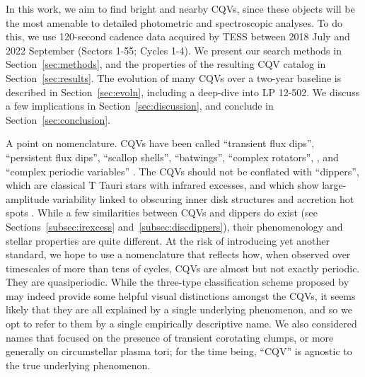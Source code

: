 \documentclass[11pt,twocolumn,tighten]{aastex63}
\begin{document}
In this work, we aim to find bright and nearby CQVs, since these
objects will be the most amenable to detailed photometric and
spectroscopic analyses.  To do this, we use 120-second cadence data
acquired by TESS between 2018 July and 2022 September (Sectors 1-55;
Cycles 1-4).  We present our search methods in
Section~\ref{sec:methods}, and the properties of the resulting CQV
catalog in Section~\ref{sec:results}.  The evolution of many CQVs over
a two-year baseline is described in Section~\ref{sec:evoln}, including
a deep-dive into LP 12-502.  We discuss a few implications in
Section~\ref{sec:discussion}, and conclude in
Section~\ref{sec:conclusion}.

A point on nomenclature.  CQVs have been called ``transient flux
dips'', ``persistent flux dips'', ``scallop shells'', ``batwings'',
\citep{2017AJ....153..152S} ``complex rotators'',
\citep{2019ApJ...876..127Z,2022AJ....163..144G,2023ApJ...945..114P},
and ``complex periodic variables'' \citep{2023MNRAS.518.2921K}.  The
CQVs should not be conflated with ``dippers'', which are classical T
Tauri stars with infrared excesses, and which show large-amplitude
variability linked to obscuring inner disk structures and accretion
hot spots \citep{2014AJ....147...82C,2021ApJ...908...16R}.  While a
few similarities between CQVs and dippers do exist (see
Sections~\ref{subsec:irexcess} and~\ref{subsec:discdippers}), their
phenomenology and stellar properties are quite different.  At the risk
of introducing yet another standard, we hope to use a nomenclature
that reflects how, when observed over timescales of more than tens of
cycles, CQVs are almost but not exactly periodic.  They are
quasiperiodic.  While the three-type classification scheme proposed by
\citet{2017AJ....153..152S} may indeed provide some helpful visual
distinctions amongst the CQVs, it seems likely that they are all
explained by a single underlying phenomenon, and so we opt to refer to
them by a single empirically descriptive name.  We also considered
names that focused on the presence of transient corotating clumps, or
more generally on circumstellar plasma tori; for the time being,
``CQV'' is agnostic to the true underlying phenomenon.
\end{document}
